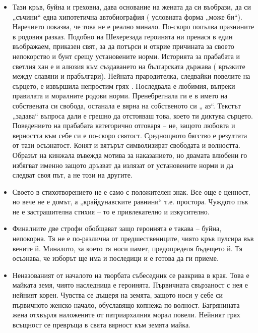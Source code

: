 \documentclass[12pt,a4paper]{article}
\begin{document}
\begin{itemize}[leftmargin=*]
\vspace{-0.2cm}
\item Тази кръв, буйна и греховна, дава основание на жената да си въобрази, да си „съчини“ една
хипотетична автобиография ( условната форма „може би“). Наречието показва, че това не е реално
минало. По-скоро попълва празнините в родовия разказ. Подобно на Шехерезада героинята ни
пренася в един въображаем, приказен свят, за да потърси и открие причината за своето непокорство
и бунт срещу установените норми. Историята за прабабата и светлия хан е и алюзия към създаването
на българската държава ( връзките между славяни и прабългари). Нейната прародителка, следвайки
повелите на сърцето, е извършила непростим грях . Последвала е любимия, въпреки правилата и
моралните родови норми. Пренебрегнала ги е в името на собствената си свобода, останала е вярна на
собственото си „ аз“. Текстът „задава“ въпроса дали е грешно да отстояваш това, което ти диктува
сърцето. Поведението на прабабата категорично отговаря – не, защото любовта и верността към себе
си е по-скоро святост. Среднощното бягство е резултата от тази осъзнатост. Конят и вятърът
символизират свободата и волността. Образът на кинжала въвежда мотива за наказанието, но
двамата влюбени го избягват именно защото дръзват да излязат от установените норми и да следват
своя път, а не този на другите.
\end{itemize}

\begin{itemize}[leftmargin=*]
\vspace{-0.2cm}
\item Своето в стихотворението не е само с положителен знак. Все още е ценност, но вече не е домът, а
„крайдунавските равнини“ т.е. простора. Чуждото пък не е застрашителна стихия – то е
привлекателно и изкусително.
\end{itemize}

\begin{itemize}[leftmargin=*]
\vspace{-0.75cm}
\item Финалните две строфи обобщават защо героинята е такава – буйна, непокорна. Тя не е по-различна
от предшествениците, чиято кръв пулсира във вените й. Миналото, за което тя носи памет,
предопределя бъдещето й. Тя осъзнава, че изборът ще има и последици и е готова да ги приеме.
\end{itemize}

\begin{itemize}[leftmargin=*]
\vspace{-0.57cm}
\item Неназованият от началото на творбата събеседник се разкрива в края. Това е майката земя, чиято
наследница е героинята. Първичната свързаност с нея е нейният корен. Чувства се дъщеря на земята,
защото носи у себе си първичното женско начало, обуславящо копнежа по волност. Багрянината
жена отхвърля наложените от патриархалния морал повели. Нейният грях всъщност се превръща в
свята вярност към земята майка.
\end{itemize}
\end{document}
